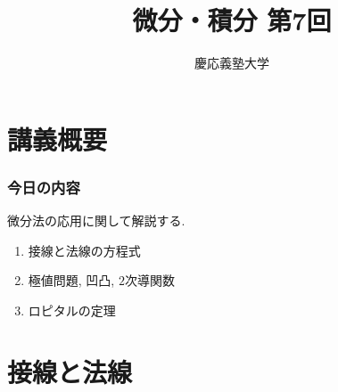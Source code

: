 \documentclass[dvipdfmx,cjk,10.2pt]{beamer}
\theoremstyle{definition}
\begin{document}
\title{微分・積分 第7回} 
\author{慶応義塾大学}            %
\date{}



\begin{frame}                  %
\titlepage                     %
\end{frame}








\section{講義概要}


\begin{frame}
\frametitle{今日の内容}


微分法の応用に関して解説する. 
\begin{enumerate}
\item 接線と法線の方程式
\item 極値問題, 凹凸, $2$次導関数
\item ロピタルの定理
\end{enumerate} 



\end{frame}









\section{接線と法線}
\end{document}

